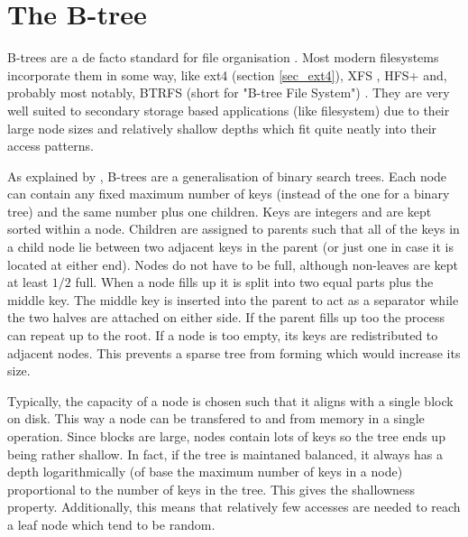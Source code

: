 

    \section{The B-tree}
        \label{sec_btree}

        B-trees are a de facto standard for file organisation
        \cite{btree_ubiquitous}. Most modern filesystems incorporate them in
        some way, like ext4 (section \ref{sec_ext4}), XFS
        \cite{XFS_scalability}, HFS+ \cite{HFSplus} and, probably most notably,
        BTRFS (short for "B-tree File System") \cite{BTRFS}. They are very well
        suited to secondary storage based applications (like filesystem) due to
        their large node sizes and relatively shallow depths which fit quite
        neatly into their access patterns.

        As explained by \citeauthor{btree_ubiquitous}, B-trees are a
        generalisation of binary search trees. Each node can contain any fixed
        maximum number of keys (instead of the one for a binary tree) and the
        same number plus one children. Keys are integers and are kept sorted
        within a node. Children are assigned to parents such that all of the
        keys in a child node lie between two adjacent keys in the parent (or
        just one in case it is located at either end). Nodes do not have to be
        full, although non-leaves are kept at least $1/2$ full. When a node
        fills up it is split into two equal parts plus the middle key. The
        middle key is inserted into the parent to act as a separator while the
        two halves are attached on either side. If the parent fills up too the
        process can repeat up to the root. If a node is too empty, its keys are
        redistributed to adjacent nodes. This prevents a sparse tree from
        forming which would increase its size.

        Typically, the capacity of a node is chosen such that it aligns with a
        single block on disk. This way a node can be transfered to and from
        memory in a single operation. Since blocks are large, nodes contain
        lots of keys so the tree ends up being rather shallow. In fact, if the
        tree is maintaned balanced, it always has a depth logarithmically (of
        base the maximum number of keys in a node) proportional to the number
        of keys in the tree. This gives the shallowness property. Additionally,
        this means that relatively few accesses are needed to reach a leaf node
        which tend to be random.

